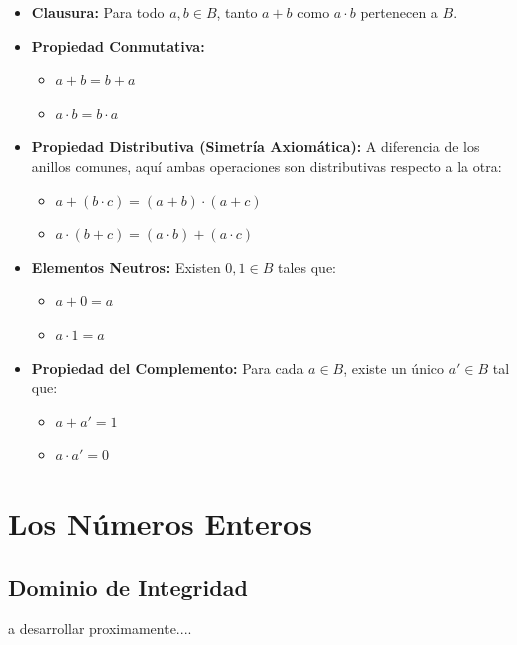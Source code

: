 \documentclass{article}
\begin{document}
\begin{itemize}
    \item \textbf{Clausura:} Para todo $a, b \in B$, tanto $a + b$ como $a \cdot b$ pertenecen a $B$.
    \item \textbf{Propiedad Conmutativa:} 
    \begin{itemize}
        \item $a + b = b + a$
        \item $a \cdot b = b \cdot a$
    \end{itemize}
    \item \textbf{Propiedad Distributiva (Simetría Axiomática):} A diferencia de los anillos comunes, aquí ambas operaciones son distributivas respecto a la otra:
    \begin{itemize}
        \item $a + (b \cdot c) = (a + b) \cdot (a + c)$
        \item $a \cdot (b + c) = (a \cdot b) + (a \cdot c)$
    \end{itemize}
    \item \textbf{Elementos Neutros:} Existen $0, 1 \in B$ tales que:
    \begin{itemize}
        \item $a + 0 = a$
        \item $a \cdot 1 = a$
    \end{itemize}
    \item \textbf{Propiedad del Complemento:} Para cada $a \in B$, existe un único $a' \in B$ tal que:
    \begin{itemize}
        \item $a + a' = 1$
        \item $a \cdot a' = 0$
    \end{itemize}
\end{itemize}



\section{Los Números Enteros}
\label{sec:numeros-enteros}

\subsection{Dominio de Integridad} 
\label{sec:dominio_de_integridad}

a desarrollar proximamente....
\end{document}

